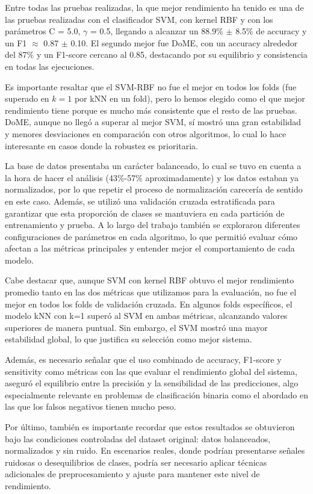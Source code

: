 \documentclass[a4paper,10pt]{article}
\begin{document}
Entre todas las pruebas realizadas, la que mejor rendimiento ha tenido es una de las pruebas realizadas con el clasificador SVM, con kernel RBF y con los parámetros C = 5.0, $\gamma$ = 0.5, llegando a alcanzar un 88.9\% $\pm$ 8.5\% de accuracy y un F1 $\approx$ 0.87 $\pm$ 0.10. El segundo mejor fue DoME, con un accuracy alrededor del 87\% y un F1-score cercano al 0.85, destacando por su equilibrio y consistencia en todas las ejecuciones.

Es importante resaltar que el SVM-RBF no fue el mejor en todos los folds (fue superado en $k=1$ por kNN en un fold), pero lo hemos elegido como el que mejor rendimiento tiene porque es mucho más consistente que el resto de las pruebas. DoME, aunque no llegó a superar al mejor SVM, sí mostró una gran estabilidad y menores desviaciones en comparación con otros algoritmos, lo cual lo hace interesante en casos donde la robustez es prioritaria.

La base de datos presentaba un carácter balanceado, lo cual se tuvo en cuenta a la hora de hacer el análisis (43\%-57\% aproximadamente) y los datos estaban ya normalizados, por lo que repetir el proceso de normalización carecería de sentido en este caso. Además, se utilizó una validación cruzada estratificada para garantizar que esta proporción de clases se mantuviera en cada partición de entrenamiento y prueba. A lo largo del trabajo también se exploraron diferentes configuraciones de parámetros en cada algoritmo, lo que permitió evaluar cómo afectan a las métricas principales y entender mejor el comportamiento de cada modelo. 

Cabe destacar que, aunque SVM con kernel RBF obtuvo el mejor rendimiento promedio tanto en las dos métricas que utilizamos para la evaluación, no fue el mejor en todos los folds de validación cruzada. En algunos folds específicos, el modelo kNN con k=1 superó al SVM en ambas métricas, alcanzando valores superiores de manera puntual. Sin embargo, el SVM mostró una mayor estabilidad global, lo que justifica su selección como mejor sistema.

Además, es necesario señalar que el uso combinado de accuracy, F1-score y sensitivity como métricas con las que evaluar el rendimiento global del sistema, aseguró el equilibrio entre la precisión y la sensibilidad de las predicciones, algo especialmente relevante en problemas de clasificación binaria como el abordado en las que los falsos negativos tienen mucho peso.

Por último, también es importante recordar que estos resultados se obtuvieron bajo las condiciones controladas del dataset original: datos balanceados, normalizados y sin ruido. En escenarios reales, donde podrían presentarse señales ruidosas o desequilibrios de clases, podría ser necesario aplicar técnicas adicionales de preprocesamiento y ajuste para mantener este nivel de rendimiento.
\end{document}
